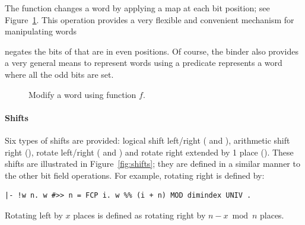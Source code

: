 {The function 
 changes
a word by applying a map at each bit position; see Figure~\ref{fig:modify}.
This operation provides a very flexible and convenient mechanism for
manipulating words \eg{}
\begin{hol}
\end{hol}
negates the bits of  that are in even positions.  Of course, the 
binder  also provides a very general means to represent words using 
a predicate \eg{}  represents a word where all the odd bits 
are set.

\begin{figure}
\begin{center}
\caption{Modify a word using function $f$.}
\label{fig:modify}
\end{center}
\end{figure}

\paragraph{Shifts}

Six types of shifts are provided: logical shift left/right (\holtxt{<<} and 
\holtxt{>>>}), arithmetic shift right (\holtxt{>>}), rotate left/right 
(\holtxt{\#<<} and \holtxt{\#>>}) and rotate right extended by 1 place 
().  These shifts are illustrated in Figure~\ref{fig:shifts}; 
they are defined in a similar manner to the other bit field operations.  For 
example, rotating right is defined by:
\begin{hol}
\begin{verbatim}
|- !w n. w #>> n = FCP i. w %% (i + n) MOD dimindex UNIV .
\end{verbatim}
\end{hol}
Rotating left by $x$ places is defined as rotating right by $n - x \bmod n$ 
places.  

}
